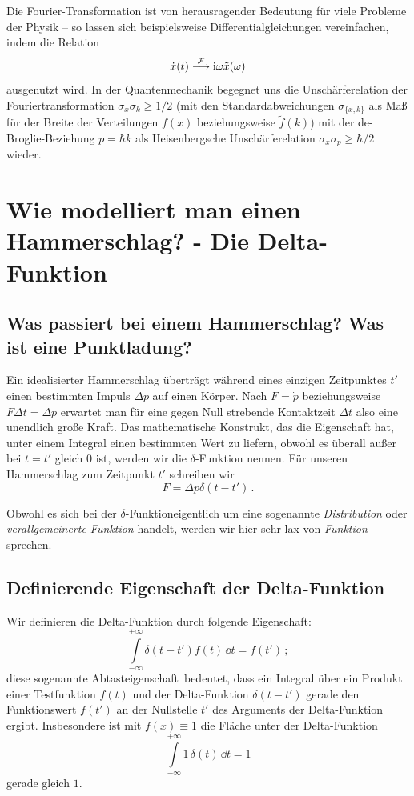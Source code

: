 \documentclass[paper=a4, fontsize=11.0pt, abstractoff, DIV12]{scrartcl}
\begin{document}
Die Fourier-Transformation ist von herausragender Bedeutung
für viele Probleme der Physik -- so lassen sich beispielsweise
Differentialgleichungen vereinfachen, indem die Relation
\[ \dot x(t) \stackrel{\operatorname{\mathcal{F}}}{\longrightarrow} \mathrm{i}\omega \tilde x (\omega)\]
ausgenutzt wird. In der Quantenmechanik begegnet uns die Unschärferelation der
Fouriertransformation $\sigma_x \sigma_k \ge 1/2$ (mit den
Standardabweichungen $\sigma_{\{x,k\}}$ als Maß für der Breite der
Verteilungen $f(x)$ beziehungsweise $\tilde f(k)$) mit der
de-Broglie-Beziehung $p=\hbar k$ als Heisenbergsche Unschärferelation
$\sigma_x \sigma_p \ge \hbar/2$ wieder.


\section{Wie modelliert man einen Hammerschlag? - Die Delta-\glqq Funktion\grqq}

\subsection{Was passiert bei einem Hammerschlag? Was ist eine Punktladung?}

Ein idealisierter Hammerschlag überträgt während eines einzigen Zeitpunktes
$t'$ einen bestimmten Impuls $\Delta p$ auf einen Körper. Nach $F=\dot{p}$
beziehungsweise $F\Delta t = \Delta p$ erwartet man für eine gegen Null
strebende Kontaktzeit $\Delta t$ also eine unendlich große Kraft. Das
mathematische Konstrukt, das die Eigenschaft hat, unter einem Integral
einen bestimmten Wert zu liefern, obwohl es überall außer bei $t=t'$ gleich
$0$ ist, werden wir die $\delta$-Funktion nennen. Für unseren Hammerschlag
zum Zeitpunkt $t'$ schreiben wir
\begin{equation}
F = \Delta p \delta(t-t')\,.
\end{equation}

Obwohl es sich bei der $\delta$-\glqq Funktion\grqq eigentlich um eine
sogenannte \emph{Distribution} oder \emph{verallgemeinerte Funktion}
handelt, werden wir hier sehr lax von \emph{Funktion} sprechen.

\subsection{Definierende Eigenschaft der Delta-Funktion}

Wir definieren die Delta-Funktion durch folgende Eigenschaft:
\begin{equation}
\int\limits_{-\infty}^{+\infty} \delta(t-t') f(t) \,\dd t = f(t')\,;
\label{eq:Abtast}
\end{equation}
diese sogenannte \glqq Abtasteigenschaft\grqq~bedeutet, dass ein Integral
über ein Produkt einer Testfunktion $f(t)$ und der Delta-Funktion
$\delta(t-t')$ gerade den Funktionswert $f(t')$ an der Nullstelle $t'$ des
Arguments der Delta-Funktion ergibt. Insbesondere ist mit $f(x) \equiv 1$
die Fläche unter der Delta-Funktion
\begin{equation}
\int\limits_{-\infty}^{+\infty} 1 \,\delta(t)\,\dd t = 1
\end{equation}
gerade gleich $1$.
\end{document}
